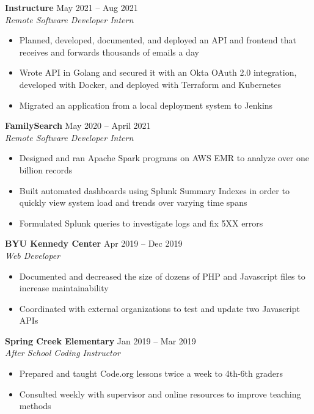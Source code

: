 \documentclass[letterpaper]{article}
\begin{document}
\textbf{Instructure} \hfill May 2021 -- Aug 2021\\
\textit{Remote Software Developer Intern}\\
\vspace{-1mm}
\begin{itemize} \itemsep 1pt
    \item Planned, developed, documented, and deployed an API and frontend that receives and forwards thousands of emails a day
    \item Wrote API in Golang and secured it with an Okta OAuth 2.0 integration, developed with Docker, and deployed with Terraform and Kubernetes
    \item Migrated an application from a local deployment system to Jenkins
\end{itemize}
\textbf{FamilySearch} \hfill May 2020 -- April 2021\\
\textit{Remote Software Developer Intern}\\
\vspace{-1mm}
\begin{itemize} \itemsep 1pt
    \item Designed and ran Apache Spark programs on AWS EMR to analyze over one billion records
    \item Built automated dashboards using Splunk Summary Indexes in order to quickly view system load and trends over varying time spans
    \item Formulated Splunk queries to investigate logs and fix 5XX errors

\end{itemize}
\textbf{BYU Kennedy Center} \hfill Apr 2019 -- Dec 2019\\
\textit{Web Developer}\\
\vspace{-1mm}
\begin{itemize} \itemsep 1pt
    \item Documented and decreased the size of dozens of PHP and Javascript files to increase maintainability
    \item Coordinated with external organizations to test and update two Javascript APIs
\end{itemize}
\textbf{Spring Creek Elementary} \hfill Jan 2019 -- Mar 2019\\
\textit{After School Coding Instructor}\\
\vspace{-1mm}
\begin{itemize} \itemsep 1pt
    \item Prepared and taught Code.org lessons twice a week to 4th-6th graders
    \item Consulted weekly with supervisor and online resources to improve teaching methods
\end{itemize}
\end{document}
